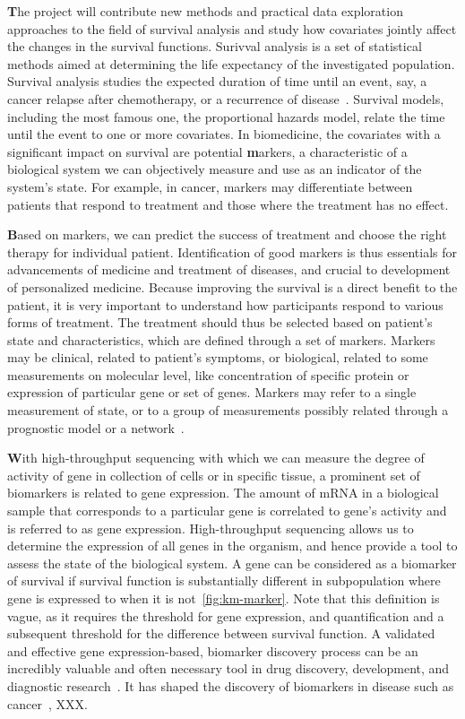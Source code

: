 \documentclass[11pt,a4paper]{article}
\renewcommand{\bf}{\textbf}
\begin{document}
{\bf The project will contribute new methods and practical data exploration approaches to the field of survival analysis and study how covariates jointly affect the changes in the survival functions.} Surivval analysis is a set of statistical methods aimed at determining the life expectancy of the investigated population. Survival analysis studies the expected duration of time until an event, say, a cancer relapse after chemotherapy, or a recurrence of disease~\cite{pazdur2008endpoints}. Survival models, including the most famous one, the proportional hazards model, relate the time until the event to one or more covariates. In biomedicine, the covariates with a significant impact on survival are potential {\bf markers}, a characteristic of a biological system we can objectively measure and use as an indicator of the system's state. For example, in cancer, markers may differentiate between patients that respond to treatment and those where the treatment has no effect. 

{\bf Based on markers, we can predict the success of treatment and choose the right therapy for individual patient. Identification of good markers is thus essentials for advancements of medicine and treatment of diseases, and crucial to development of personalized medicine.} Because improving the survival is a direct benefit to the patient, it is very important to understand how participants respond to various forms of treatment. The treatment should thus be selected based on patient's state and characteristics, which are defined through a set of markers. Markers may be clinical, related to patient's symptoms, or biological, related to some measurements on molecular level, like concentration of specific protein or expression of particular gene or set of genes. Markers may refer to a single measurement of state, or to a group of measurements possibly related through a prognostic model or a network~\cite{Sonawane2019}.

{\bf With high-throughput sequencing with which we can measure the degree of activity of gene in collection of cells or in specific tissue, a prominent set of biomarkers is related to gene expression.} The amount of mRNA in a biological sample that corresponds to a particular gene is correlated to gene's activity and is referred to as gene expression. High-throughput sequencing allows us to determine the expression of all genes in the organism, and hence provide a tool to assess the state of the biological system. A gene can be considered as a biomarker of survival if survival function is substantially different in subpopulation where gene is expressed to when it is not~\ref{fig:km-marker}. Note that this definition is vague, as it requires the threshold for gene expression, and quantification and a subsequent threshold for the difference between survival function. A validated and effective gene expression-based, biomarker discovery process can be an incredibly valuable and often necessary tool in drug discovery, development, and diagnostic research~\cite{MonforteMcPhail2005}. It has shaped the discovery of biomarkers in disease such as cancer~\cite{HENRY2012140}, XXX.
\end{document}

